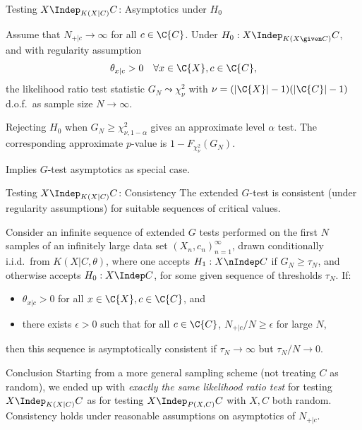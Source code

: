 \begin{frame}{Testing $X \Indep_{K(X|C)} C$: Asymptotics under $H_0$}
\begin{Prp}
Assume that $N_{+|c} \to \infty$ for all $c \in \C{C}$.
Under $H_0 : X \Indep_{K(X \given C)} C$, and with regularity assumption
$$\theta_{x|c} > 0 \quad\forall x \in \C{X}, c \in \C{C},$$
the likelihood ratio test statistic $G_N \leadsto \chi_\nu^2$ 
with $\nu = (|\C{X}| - 1)(|\C{C}| - 1)$ d.o.f.\ as sample size $N \to \infty$.
\end{Prp}
\begin{Cor}
  Rejecting $H_0$ when $G_N \ge \chi_{\nu,1-\alpha}^2$ gives an approximate level $\alpha$ test.
  The corresponding approximate $p$-value is $1-F_{\chi^2_\nu}(G_N)$.
\end{Cor}
Implies $G$-test asymptotics as special case. 

\end{frame}

\begin{frame}{Testing $X \Indep_{K(X|C)} C$: Consistency}
  The extended $G$-test is consistent (under regularity assumptions) for suitable sequences of critical values.
  \begin{Cor}
  Consider an infinite sequence of extended $G$ tests performed on the first $N$ samples of an infinitely large
  data set $(X_n,c_n)_{n=1}^\infty$, drawn conditionally i.i.d.\ from $K(X|C,\theta)$,
  where one accepts $H_1 : X \nIndep C$ if $G_N \ge \tau_N$, and otherwise accepts $H_0 : X \Indep C$,
  for some given sequence of thresholds $\tau_N$.
  If:
    \begin{itemize}
      \item $\theta_{x|c} > 0$ for all $x \in \C{X}, c \in \C{C}$, and
      \item there exists $\epsilon > 0$ such that for all $c \in \C{C}$, $N_{+|c} / N \ge \epsilon$ for large $N$,
    \end{itemize}
  then this sequence is asymptotically consistent if $\tau_N \to \infty$ but $\tau_N / N \to 0$.
  \end{Cor}
\begin{block}{Conclusion}
  Starting from a more general sampling scheme (not treating $C$ as random), we ended up with \emph{exactly the same likelihood ratio test} for testing $X \Indep_{K(X|C)} C$ as for testing $X \Indep_{P(X,C)} C$ with $X,C$ both random. 
  Consistency holds under reasonable assumptions on asymptotics of $N_{+|c}$.
\end{block}
\end{frame}

